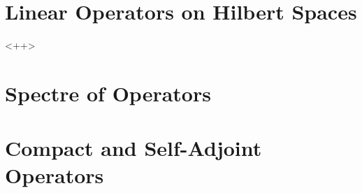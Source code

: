 \documentclass[../complete.tex]{subfiles}
\begin{document}
\section{Linear Operators on Hilbert Spaces}
<++>
\section{Spectre of Operators}
\section{Compact and Self-Adjoint Operators}
\end{document}
